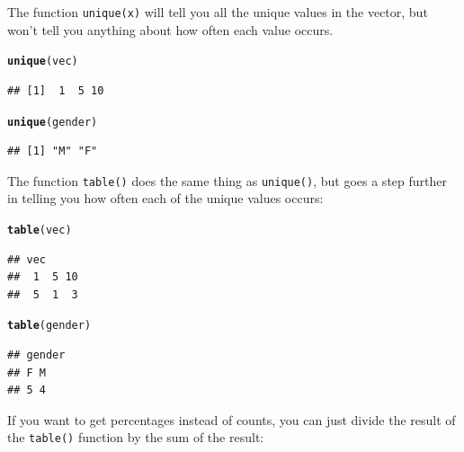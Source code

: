 \documentclass{tufte-book}\usepackage[]{graphicx}\usepackage[]{color}
\makeatletter
\newcommand{\hlstd}[1]{\textcolor[rgb]{0.345,0.345,0.345}{#1}}%
\newcommand{\hlkwd}[1]{\textcolor[rgb]{0.737,0.353,0.396}{\textbf{#1}}}%
\newenvironment{kframe}{%
 \def\at@end@of@kframe{}%
 \ifinner\ifhmode%
  \def\at@end@of@kframe{\end{minipage}}%
  \begin{minipage}{\columnwidth}%
 \fi\fi%
 \def\FrameCommand##1{\hskip\@totalleftmargin \hskip-\fboxsep
 \colorbox{shadecolor}{##1}\hskip-\fboxsep
     \hskip-\linewidth \hskip-\@totalleftmargin \hskip\columnwidth}%
 \MakeFramed {\advance\hsize-\width
   \@totalleftmargin\z@ \linewidth\hsize
   \@setminipage}}%
 {\par\unskip\endMakeFramed%
 \at@end@of@kframe}
\newenvironment{knitrout}{}{} %
\makeatother
\begin{document}
The function \texttt{unique(x)} will tell you all the unique values in the vector, but won't tell you anything about how often each value occurs.


\begin{knitrout}
\color{fgcolor}\begin{kframe}
\begin{alltt}
\hlkwd{unique}\hlstd{(vec)}
\end{alltt}
\begin{verbatim}
## [1]  1  5 10
\end{verbatim}
\begin{alltt}
\hlkwd{unique}\hlstd{(gender)}
\end{alltt}
\begin{verbatim}
## [1] "M" "F"
\end{verbatim}
\end{kframe}
\end{knitrout}


The function \texttt{table()} does the same thing as \texttt{unique()}, but goes a step further in telling you how often each of the unique values occurs:


\begin{knitrout}
\color{fgcolor}\begin{kframe}
\begin{alltt}
\hlkwd{table}\hlstd{(vec)}
\end{alltt}
\begin{verbatim}
## vec
##  1  5 10 
##  5  1  3
\end{verbatim}
\begin{alltt}
\hlkwd{table}\hlstd{(gender)}
\end{alltt}
\begin{verbatim}
## gender
## F M 
## 5 4
\end{verbatim}
\end{kframe}
\end{knitrout}

If you want to get percentages instead of counts, you can just divide the result of the \texttt{table()} function by the sum of the result:
\end{document}
